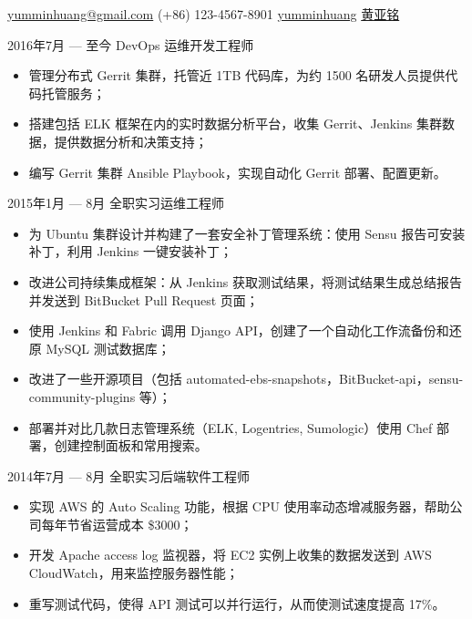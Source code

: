 \documentclass{newresume}
\begin{document}
{\href{mailto:yumminhuang@gmail.com}{yumminhuang@gmail.com}}
{(+86) 123-4567-8901}
{\href{https://github.com/yumminhuang}{yumminhuang}}
{\href{https://www.linkedin.com/in/yaming-huang-6a09325b/zh-cn}{黄亚铭}}
{}


\begin{body}
	{2016年7月 --- 至今}
	{DevOps 运维开发工程师}{}
	\begin{itemize}[noitemsep,topsep=0pt]
		\item 管理分布式 Gerrit 集群，托管近 1TB 代码库，为约 1500 名研发人员提供代码托管服务；
		\item 搭建包括 ELK 框架在内的实时数据分析平台，收集 Gerrit、Jenkins 集群数据，提供数据分析和决策支持；
		\item 编写 Gerrit 集群 Ansible Playbook，实现自动化 Gerrit 部署、配置更新。
	\end{itemize}
\end{body}

\begin{body}
	{2015年1月 --- 8月}
	{全职实习运维工程师}{}
	\begin{itemize}[noitemsep,topsep=0pt]
		\item 为 Ubuntu 集群设计并构建了一套安全补丁管理系统：使用 Sensu 报告可安装补丁，利用 Jenkins 一键安装补丁；
		\item 改进公司持续集成框架：从 Jenkins 获取测试结果，将测试结果生成总结报告并发送到 BitBucket Pull Request 页面；
		\item 使用 Jenkins 和 Fabric 调用 Django API，创建了一个自动化工作流备份和还原 MySQL 测试数据库；
		\item 改进了一些开源项目（包括 automated-ebs-snapshots，BitBucket-api，sensu-community-plugins 等）；
		\item 部署并对比几款日志管理系统（ELK, Logentries, Sumologic）使用 Chef 部署，创建控制面板和常用搜索。
	\end{itemize}
\end{body}

\begin{body}
	{2014年7月 --- 8月}
	{全职实习后端软件工程师}{}
	\begin{itemize}[noitemsep,topsep=0pt]
		\item 实现 AWS 的 Auto Scaling 功能，根据 CPU 使用率动态增减服务器，帮助公司每年节省运营成本 \$3000；
		\item 开发 Apache access log 监视器，将 EC2 实例上收集的数据发送到 AWS CloudWatch，用来监控服务器性能；
		\item 重写测试代码，使得 API 测试可以并行运行，从而使测试速度提高 17\%。
	\end{itemize}
\end{body}
\end{document}
